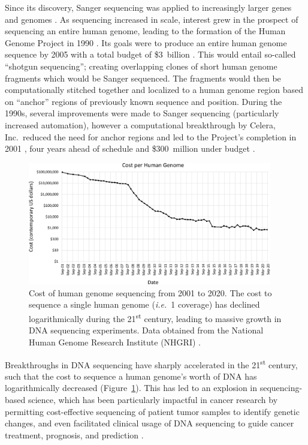Since its discovery, Sanger sequencing was applied to increasingly larger genes and genomes \cite{shendure2017}. As sequencing increased in scale, interest grew in the prospect of sequencing an entire human genome, leading to the formation of the Human Genome Project in 1990 \cite{green2015}. Its goals were to produce an entire human genome sequence by 2005 with a total budget of \$3~billion \cite{sawicki1993}. This would entail so-called ``shotgun sequencing''; creating overlapping clones of short human genome fragments which would be Sanger sequenced. The fragments would then be computationally stitched together and localized to a human genome region based on ``anchor'' regions of previously known sequence and position. During the 1990s, several improvements were made to Sanger sequencing (particularly increased automation), however a computational breakthrough by Celera, Inc.\ reduced the need for anchor regions and led to the Project's completion in 2001 \cite{venter2001}, four years ahead of schedule and \$300~million under budget \cite{kling2005,gyles2008}.

\begin{figure}[htb]
    \centering
    \includegraphics[width=0.95\textwidth,keepaspectratio]{images/intro/sequencing_cost}
    \caption[Cost of human genome sequencing from 2001--2020]{Cost of human genome sequencing from 2001 to 2020. The cost to sequence a single human genome (\textit{i.e.}\ 1\texttimes{} coverage) has declined logarithmically during the 21\textsuperscript{st} century, leading to massive growth in DNA sequencing experiments. Data obtained from the National Human Genome Research Institute (NHGRI) \cite{wetterstrand2020}.}
    \label{fig:intro:sequencing_cost}
\end{figure}
Breakthroughs in DNA sequencing have sharply accelerated in the 21\textsuperscript{st} century, such that the cost to sequence a human genome's worth of DNA has logarithmically decreased (Figure~\ref{fig:intro:sequencing_cost}). This has led to an explosion in sequencing-based science, which has been particularly impactful in cancer research by permitting cost-effective sequencing of patient tumor samples to identify genetic changes, and even facilitated clinical usage of DNA sequencing to guide cancer treatment, prognosis, and prediction \cite{rizzo2012}.

